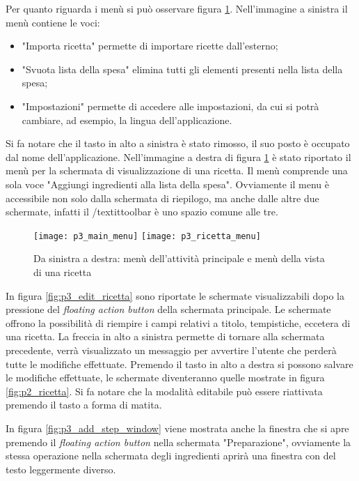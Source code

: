 Per quanto riguarda i menù si può osservare figura \ref{fig:p3_menu}.
Nell'immagine a sinistra il menù contiene le voci:
\begin{itemize}
  \item "Importa ricetta" permette di importare ricette dall'esterno;
  \item "Svuota lista della spesa" elimina tutti gli elementi presenti nella lista della spesa;
  \item "Impostazioni" permette di accedere alle impostazioni, da cui si potrà cambiare, ad esempio, la lingua dell'applicazione.
\end{itemize}
Si fa notare che il tasto in alto a sinistra è stato rimosso, il suo posto è occupato dal nome dell'applicazione.
Nell'immagine a destra di figura \ref{fig:p3_menu} è stato riportato il menù per la schermata di visualizzazione di una ricetta.
Il menù comprende una sola voce "Aggiungi ingredienti alla lista della spesa".
Ovviamente il menu è accessibile non solo dalla schermata di riepilogo, ma anche dalle altre due schermate, infatti il /textit{toolbar} è uno spazio comune alle tre.
\begin{figure}[ht]
  \begin{center}
    \texttt{[image: p3\_main\_menu]}
    \texttt{[image: p3\_ricetta\_menu]}
    \caption{Da sinistra a destra: menù dell'attività principale e menù della vista di una ricetta}
    \label{fig:p3_menu}
  \end{center}
\end{figure}
\clearpage

In figura \ref{fig:p3_edit_ricetta} sono riportate le schermate visualizzabili dopo la pressione del \textit{floating action button} della schermata principale.
Le schermate offrono la possibilità di riempire i campi relativi a titolo, tempistiche, eccetera di una ricetta.
La freccia in alto a sinistra permette di tornare alla schermata precedente, verrà visualizzato un messaggio per avvertire l'utente che perderà tutte le modifiche effettuate.
Premendo il tasto in alto a destra si possono salvare le modifiche effettuate, le schermate diventeranno quelle mostrate in figura \ref{fig:p2_ricetta}.
Si fa notare che la modalità editabile può essere riattivata premendo il tasto a forma di matita.


In figura \ref{fig:p3_add_step_window} viene mostrata anche la finestra che si apre premendo il \textit{floating action button} nella schermata "Preparazione", ovviamente la stessa operazione nella schermata degli ingredienti aprirà una finestra con del testo leggermente diverso.

